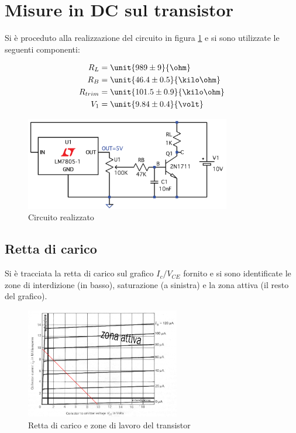 \documentclass[10pt,a4paper]{article}
\begin{document}
\section{Misure in DC sul transistor}
Si è proceduto alla realizzazione del circuito in figura \figurename{\ref{circuito}} e si sono utilizzate le seguenti componenti:
\begin{figure}[h!]
\begin{minipage}[c]{0.5\textwidth}
\begin{align*}
R_L &= \unit{989 \pm 9}{\ohm}\\
R_B &= \unit{46.4 \pm 0.5}{\kilo\ohm}\\
R_{trim} &= \unit{101.5 \pm 0.9}{\kilo \ohm}\\
V_1 &= \unit{9.84 \pm 0.4}{\volt}\\
\end{align*}
	\end{minipage}
	\begin{minipage}[c]{0.5\textwidth}
	\centering
	\includegraphics[width=0.8\textwidth]{../grafici/circuito.png}
	\caption{Circuito realizzato}
	\label{circuito}
	\end{minipage}
\end{figure}

\subsection{Retta di carico}
Si è tracciata la retta di carico sul grafico $I_c/V_{CE}$ fornito e si sono identificate le zone di interdizione (in basso), saturazione (a sinistra) e la zona attiva (il resto del grafico).
\begin{figure}[h]
	\centering
	\includegraphics[width=0.6\textwidth]{../grafici/retta_carico.png}
	\caption{Retta di carico e zone di lavoro del transistor}
	\label{retta_carico}
\end{figure}
\end{document}
